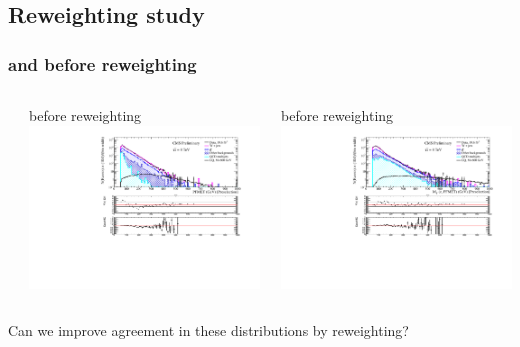 \documentclass[bigger]{beamer}
\begin{document}
\subsection{Reweighting study}
\label{sec-1-9}
\begin{frame}
\frametitle{\met and \mt before reweighting}
\label{sec-1-9-1}
\begin{columns} %
\label{sec-1-9-1-1}
\begin{column}{0.6\textwidth}
\label{sec-1-9-1-1-1}

\centering
\met before reweighting
\includegraphics[width=\textwidth]{fig/enu/preselection/MET_PAS_enujj.pdf}
\end{column}
\begin{column}{0.6\textwidth}
\label{sec-1-9-1-1-2}

\centering
\mt before reweighting
\includegraphics[width=\textwidth]{fig/enu/preselection/MTenu_PAS_enujj.pdf}
\end{column}
\end{columns}
\label{sec-1-9-1-2}

\small
\centering
Can we improve agreement in these distributions by reweighting?
\end{frame}
\end{document}
